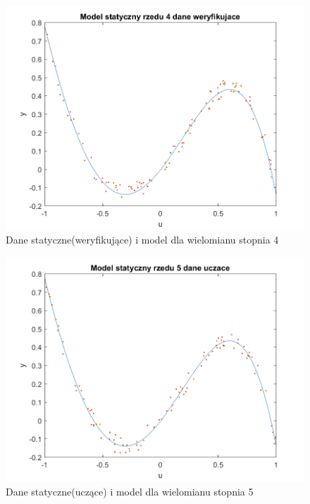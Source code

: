 \documentclass{article}
\begin{document}
\begin{figure}
\centering
\includegraphics[width=0.95\linewidth]{../dane_statyczne/dane_statyczne_model_rzedu_4_weryf}
\caption{Dane statyczne(weryfikujące) i model dla wielomianu stopnia 4}
\label{fig:danestatyczneweryf4}
\end{figure}

\begin{figure}
\centering
\includegraphics[width=0.95\linewidth]{../dane_statyczne/dane_statyczne_model_rzedu_5_uczace}
\caption{Dane statyczne(uczące) i model dla wielomianu stopnia 5}
\label{fig:danestatyczneuczace5}
\end{figure}
\end{document}
